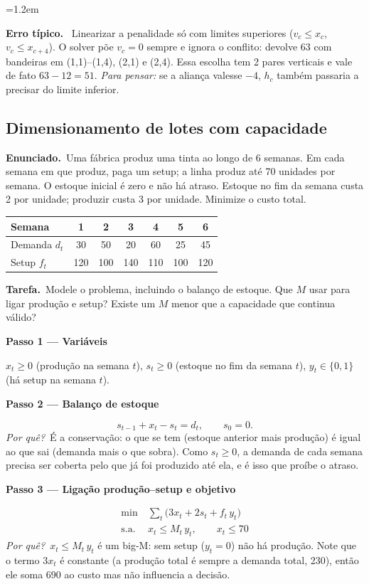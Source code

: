 \documentclass[11pt,a4paper]{article}
\newcommand{\enunciado}{\par\textbf{Enunciado.}\ }
\newcommand{\tarefa}{\par\textbf{Tarefa.}\ }
\newcommand{\passo}[1]{\par\medskip\textbf{#1}\par}
\newcommand{\porque}{\textit{Por quê?}\ }
\newenvironment{nota}[1]{\par\smallskip\begin{list}{}{\leftmargin=1.2em\rightmargin=0pt}\item[]\textbf{#1.}\ }{\end{list}}
\begin{document}
\begin{nota}{Erro típico}
Linearizar a penalidade só com limites superiores ($v_c\le x_c$, $v_c\le x_{c+4}$). O solver põe $v_c=0$ sempre e ignora o
conflito: devolve 63 com bandeiras em (1,1)--(1,4), (2,1) e (2,4). Essa escolha tem 2 pares verticais e vale de fato
$63-12=51$. \textit{Para pensar:} se a aliança valesse $-4$, $h_c$ também passaria a precisar do limite inferior.
\end{nota}

\subsection{Dimensionamento de lotes com capacidade}
\enunciado Uma fábrica produz uma tinta ao longo de 6 semanas. Em cada semana em que produz, paga um setup; a linha
produz até 70 unidades por semana. O estoque inicial é zero e não há atraso. Estoque no fim da semana custa 2 por unidade;
produzir custa 3 por unidade. Minimize o custo total.
\begin{center}
\begin{tabular}{lcccccc}
\toprule
Semana & 1 & 2 & 3 & 4 & 5 & 6\\
\midrule
Demanda $d_t$ & 30 & 50 & 20 & 60 & 25 & 45\\
Setup $f_t$ & 120 & 100 & 140 & 110 & 100 & 120\\
\bottomrule
\end{tabular}
\end{center}
\tarefa Modele o problema, incluindo o balanço de estoque. Que $M$ usar para ligar produção e setup? Existe um $M$ menor
que a capacidade que continua válido?

\passo{Passo 1 --- Variáveis}
$x_t\ge0$ (produção na semana $t$), $s_t\ge0$ (estoque no fim da semana $t$), $y_t\in\{0,1\}$ (há setup na semana $t$).

\passo{Passo 2 --- Balanço de estoque}
\[
  s_{t-1} + x_t - s_t = d_t, \qquad s_0 = 0 .
\]
\porque É a conservação: o que se tem (estoque anterior mais produção) é igual ao que sai (demanda mais o que sobra). Como
$s_t\ge0$, a demanda de cada semana precisa ser coberta pelo que já foi produzido até ela, e é isso que proíbe o atraso.

\passo{Passo 3 --- Ligação produção--setup e objetivo}
\begin{align*}
  \min\ & \sum_t \bigl(3x_t + 2s_t + f_t\,y_t\bigr)\\
  \text{s.a.}\ & x_t \le M_t\,y_t, \qquad x_t \le 70
\end{align*}
\porque $x_t\le M_t\,y_t$ é um big-M: sem setup ($y_t=0$) não há produção. Note que o termo $3x_t$ é constante (a produção
total é sempre a demanda total, 230), então ele soma 690 ao custo mas não influencia a decisão.
\end{document}
